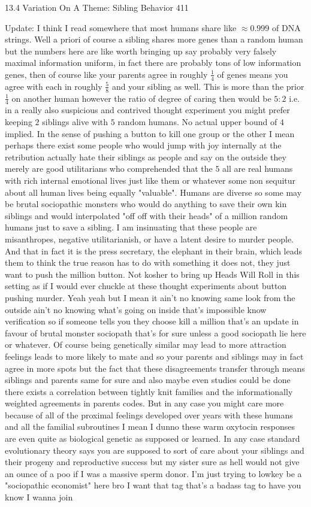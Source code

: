 13.4 Variation On A Theme: Sibling Behavior 411

Update: I think I read somewhere that most humans share like $\approx 0.999$ of DNA strings. Well a priori of course a sibling shares more genes than a random human but the numbers here are like worth bringing up say probably very falsely maximal information uniform, in fact there are probably tons of low information genes, then of course like your parents agree in roughly $\frac{1}{4}$ of genes means you agree with each in roughly $\frac{5}{8}$ and your sibling as well. This is more than the prior $\frac{1}{4}$ on another human however the ratio of degree of caring then would be $5:2$ i.e. in a really also suspicious and contrived thought experiment you might prefer keeping $2$ siblings alive with $5$ random humans. No actual upper bound of $4$ implied. In the sense of pushing a button to kill one group or the other I mean perhaps there exist some people who would jump with joy internally at the retribution actually hate their siblings as people and say on the outside they merely are good utilitarians who comprehended that the $5$ all are real humans with rich internal emotional lives just like them or whatever some non sequitur about all human lives being equally "valuable". Humans are diverse so some may be brutal sociopathic monsters who would do anything to save their own kin siblings and would interpolated "off off with their heads" of a million random humans just to save a sibling. I am insinuating that these people are misanthropes, negative utilitarianish, or have a latent desire to murder people. And that in fact it is the press secretary, the elephant in their brain, which leads them to think the true reason has to do with something it does not, they just want to push the million button. Not kosher to bring up Heads Will Roll in this setting as if I would ever chuckle at these thought experiments about button pushing murder. Yeah yeah but I mean it ain't no knowing same look from the outside ain't no knowing what's going on inside that's impossible know verification so if someone tells you they choose kill a million that's an update in favour of brutal monster sociopath that's for sure unless a good sociopath lie here or whatever. Of course being genetically similar may lead to more attraction feelings leads to more likely to mate and so your parents and siblings may in fact agree in more spots but the fact that these disagreements transfer through means siblings and parents same for sure and also maybe even studies could be done there exists a correlation between tightly knit families and the informationally weighted agreements in parents codes. But in any case you might care more because of all of the proximal feelings developed over years with these humans and all the familial subroutines I mean I dunno these warm oxytocin responses are even quite as biological genetic as supposed or learned. In any case standard evolutionary theory says you are supposed to sort of care about your siblings and their progeny and reproductive success but my sister sure as hell would not give an ounce of a poo if I was a massive sperm donor. I'm just trying to lowkey be a "sociopathic economist" here bro I want that tag that's a badass tag to have you know I wanna join 
